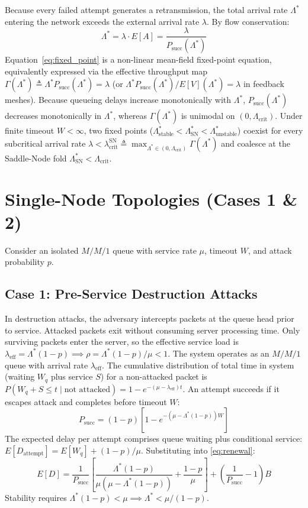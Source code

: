 \documentclass[journal,compsoc]{IEEEtran}
\begin{document}
Because every failed attempt generates a retransmission, the total arrival rate $\Lambda^*$ entering the network exceeds the external arrival rate $\lambda$. By flow conservation:
\begin{equation}
\Lambda^* = \lambda \cdot E[A] = \frac{\lambda}{P_{\text{succ}}(\Lambda^*)}
\label{eq:fixed_point}
\end{equation}
Equation~\eqref{eq:fixed_point} is a non-linear mean-field fixed-point equation, equivalently expressed via the effective throughput map $\Gamma(\Lambda^*) \triangleq \Lambda^* P_{\text{succ}}(\Lambda^*) = \lambda$ (or $\Lambda^* P_{\text{succ}}(\Lambda^*)/E[V](\Lambda^*) = \lambda$ in feedback meshes). Because queueing delays increase monotonically with $\Lambda^*$, $P_{\text{succ}}(\Lambda^*)$ decreases monotonically in $\Lambda^*$, whereas $\Gamma(\Lambda^*)$ is unimodal on $(0, \Lambda_{\text{crit}})$. Under finite timeout $W < \infty$, two fixed points ($\Lambda_{\text{stable}}^* < \Lambda_{\text{SN}}^* < \Lambda_{\text{unstable}}^*$) coexist for every subcritical arrival rate $\lambda < \lambda_{\text{crit}}^{\text{SN}} \triangleq \max_{\Lambda^* \in (0, \Lambda_{\text{crit}})} \Gamma(\Lambda^*)$ and coalesce at the Saddle-Node fold $\Lambda_{\text{SN}}^* < \Lambda_{\text{crit}}$.

\section{Single-Node Topologies (Cases 1 \& 2)}
Consider an isolated $M/M/1$ queue with service rate $\mu$, timeout $W$, and attack probability $p$.

\subsection{Case 1: Pre-Service Destruction Attacks}
In destruction attacks, the adversary intercepts packets at the queue head prior to service. Attacked packets exit without consuming server processing time. Only surviving packets enter the server, so the effective service load is $\lambda_{\text{eff}} = \Lambda^*(1 - p) \implies \rho = \Lambda^*(1 - p)/\mu < 1$. The system operates as an $M/M/1$ queue with arrival rate $\lambda_{\text{eff}}$. The cumulative distribution of total time in system (waiting $W_q$ plus service $S$) for a non-attacked packet is $P(W_q + S \le t \mid \text{not attacked}) = 1 - e^{-(\mu - \lambda_{\text{eff}})t}$. An attempt succeeds if it escapes attack and completes before timeout $W$:
\begin{equation}
P_{\text{succ}} = (1 - p)\!\left[1 - e^{-(\mu - \Lambda^*(1-p))W}\right]
\label{eq:psucc_destr}
\end{equation}
The expected delay per attempt comprises queue waiting plus conditional service: $E[D_{\text{attempt}}] = E[W_q] + (1-p)/\mu$. Substituting into \eqref{eq:renewal}:
\begin{equation}
E[D] = \frac{1}{P_{\text{succ}}}\!\left[\frac{\Lambda^*(1\!-\!p)}{\mu(\mu - \Lambda^*(1\!-\!p))} + \frac{1\!-\!p}{\mu}\right] + \left(\frac{1}{P_{\text{succ}}} - 1\right)\!B
\label{eq:delay_destr}
\end{equation}
Stability requires $\Lambda^*(1-p) < \mu \implies \Lambda^* < \mu/(1-p)$.
\end{document}
